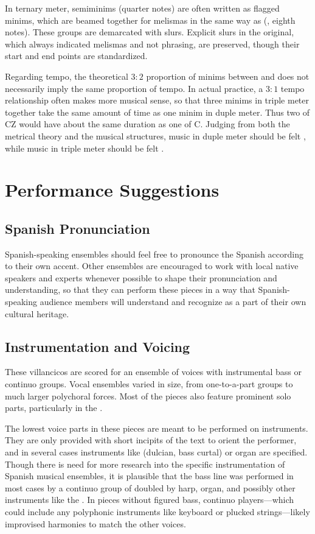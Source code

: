 In ternary meter, semiminims (quarter notes) are often written as flagged
minims, which are beamed together for melismas in the same way as
 (, eighth notes).
These groups are demarcated with slurs.
Explicit slurs in the original, which always indicated melismas and not
phrasing, are preserved, though their start and end points are standardized.

Regarding tempo, the theoretical $3:2$ proportion of minims between
\meterCThreeTwo{} and \meterC{} does not necessarily imply the same proportion of
tempo.  
In actual practice, a $3:1$ tempo relationship often makes more musical sense,
so that three minims in triple meter together take the same amount of time as
one minim in duple meter.
Thus two  of CZ would have about the same duration as one 
 of C.
Judging from both the metrical theory and the musical structures, music in
duple meter should be felt , while music in triple meter should
be felt .



\section{Performance Suggestions}

\subsection{Spanish Pronunciation}
Spanish-speaking ensembles should feel free to pronounce the Spanish according
to their own accent.
Other ensembles are encouraged to work with local native speakers and experts
whenever possible to shape their pronunciation and understanding, so that they
can perform these pieces in a way that Spanish-speaking audience members will
understand and recognize as a part of their own cultural heritage.

\subsection{Instrumentation and Voicing}
These villancicos are scored for an ensemble of voices with instrumental bass 
or continuo groups.
Vocal ensembles varied in size, from one-to-a-part groups to much larger 
polychoral forces.
Most of the pieces also feature prominent solo parts, particularly in the 
.

The lowest voice parts in these pieces are meant to be performed on instruments. 
They are only provided with short incipits of the text to orient the 
performer, and in several cases instruments like  (dulcian, bass
curtal) or organ are specified.
Though there is need for more research into the specific instrumentation of 
Spanish musical ensembles, it is plausible that the bass line was performed in 
most cases by a continuo group of  doubled by harp, organ, and 
possibly other instruments like the .%
    \Autocite
    [On the changing instrumentation in one Spanish institution, see][]
    {Torrente:PhD}
In pieces without figured bass, continuo players---which could include any
polyphonic instruments like keyboard or plucked strings---likely improvised
harmonies to match the other voices.

